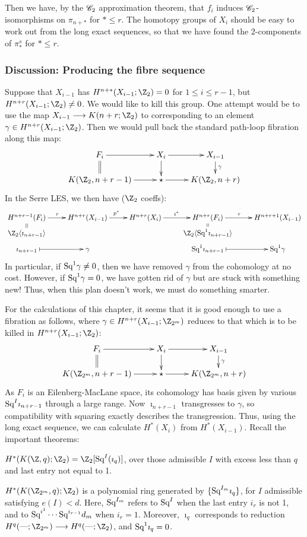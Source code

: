 \documentclass[11pt]{article}
\begin{document}
{Then we have, by the $\mathscr{C}_2$ approximation theorem, that $f_i$ induces 
$\mathscr{C}_2$-isomorphisms on $\pi_{n+*}$ for $*\leq r$. The homotopy groups
of $X_i$ should be easy to work out from the long exact sequences, so that we
have found the $2$-components of $\pi_*^s$ for $*\leq r$.

\subsubsection{Discussion: Producing the fibre sequence}
Suppose that $X_{i-1}$ has $H^{n+*}(X_{i-1};\Z_2)=0$ for $1\leq i\leq r-1$, but
 $H^{n+r}(X_{i-1};\Z_2)\neq0$. We would like to kill this group. One attempt
would be to use the map $X_{i-1}\to K(n+r;\Z_2)$ to corresponding to an element
$\gamma\in H^{n+r}(X_{i-1};\Z_2)$. Then we would pull back the standard
path-loop fibration along this map:
\[\xymatrix@R=5mm{
F_i\ar[r]\ar@{=}[d]&
X_i\ar[d]\ar[r]&
X_{i-1}\ar[d]^\gamma\\
K(\Z_2,n+r-1)\ar[r]&\star\ar[r]&K(\Z_2,n+r)
}\]
In the Serre LES, we then have ($\Z_2$ coeffs):
\[\xymatrix@R=1.5mm{
H^{n+r-1}(F_i)\ar@{->}[r]^{\tau}&
H^{n+r}(X_{i-1})\ar[r]^{p^*}&
H^{n+r}(X_i)\ar[r]^{i^*}&
H^{n+r}(F_i)\ar@{->}[r]^{\tau\ \ \ }&%
H^{n+r+1}(X_{i-1})\\
\Z_2\langle\imath_{n+r-1}\rangle\ar@{=}[u]&
&&
\Z_2\langle\Squ^1\imath_{n+r-1}\rangle\ar@{=}[u]\\
\imath_{n+r-1}\ar@{|->}[r]&\gamma&&
\Squ^1\imath_{n+r-1}\ar@{|->}[r]&\Squ^1\gamma
}\]
In particular, if $\textup{Sq}^1\gamma\neq0$, then we have removed $\gamma$ from the 
cohomology at no cost. However, if $\textup{Sq}^1\gamma=0$, we have gotten rid of 
$\gamma$ but are stuck with something new! Thus, when this plan doesn't work, 
we must do something smarter.

For the calculations of this chapter, it seems that it is good enough to use a
fibration as follows, where $\gamma\in H^{n+r}(X_{i-1};\Z_{2^m})$ reduces to that
which is to be killed in $H^{n+r}(X_{i-1};\Z_2)$:
\[\xymatrix@R=5mm{
F_i\ar[r]\ar@{=}[d]&
X_i\ar[d]\ar[r]&
X_{i-1}\ar[d]^\gamma\\
K(\Z_{2^m},n+r-1)\ar[r]&\star\ar[r]&K(\Z_{2^m},n+r)
}\]
As $F_i$ is an Eilenberg-MacLane space, its cohomology has basis given by 
various $\textup{Sq}^I\imath_{n+r-1}$ through a large range.
Now $\imath_{n+r-1}$ transgresses to $\gamma$, so compatibility with squaring
exactly describes the transgression.
Thus, using the long exact sequence, we can calculate $H^*(X_i)$ from 
$H^*(X_{i-1})$.
Recall the important theorems:
\begin{thm*}$H^*(K(\Z,q);\Z_2)=\Z_2[\Squ^I(\imath_q)]$, over those admissible $I$
 with excess less than $q$ and last entry not equal to 1.
\end{thm*}
\begin{thm*}
$H^*(K(\Z_{2^m},q);\Z_2)$ is a polynomial ring generated by
$\{\textup{Sq}^{I_m}\imath_q\}$, for $I$ admissible satisfying $e(I)<d$. Here,
$\textup{Sq}^{I_m}$ refers to $\textup{Sq}^I$ when the last entry $i_r$ is not 1, and to
$\textup{Sq}^{i^1}\cdots \textup{Sq}^{i_{r-1}}d_m$ when $i_r=1$. Moreover, $\imath_q$ corresponds
to reduction $H^q(\DASH;\Z_{2^m})\to H^q(\DASH;\Z_{2})$, and $\textup{Sq}^1\imath_q=0$.
\end{thm*}
}
\end{document}
